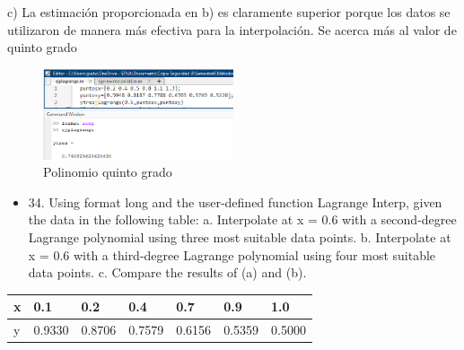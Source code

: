 \documentclass{article}
\begin{document}
c) La estimación proporcionada en b) es claramente superior porque los datos se utilizaron de manera más efectiva para la interpolación. Se acerca más al valor de quinto grado 
\begin{figure}[H]
    \centering
    \includegraphics[width=0.5\textwidth]{33c.png}
    \caption{Polinomio quinto grado}
    \label{fig:imagen1}
    \end{figure}
\begin{itemize}
    \item 34. Using format long and the user-defined function Lagrange
          Interp, given the data in the following table:
          \newline  a. Interpolate at x = 0.6 with a second-degree Lagrange polynomial
          using three most suitable data points.
          \newline  b. Interpolate at x = 0.6 with a third-degree Lagrange polynomial
          using four most suitable data points.
          \newline  c. Compare the results of (a) and (b).
\end{itemize}

\begin{table}[h!]
    \begin{tabular}{l|l|l|l|l|l|l}
        \hline
        \multicolumn{1}{|p{30.865313pt}}{\raggedright x} & \multicolumn{1}{|p{31.618126pt}}{\raggedright 0.1}    & \multicolumn{1}{|p{31.618126pt}}{\raggedright 0.2}    & \multicolumn{1}{|p{33.876564pt}}{\raggedright 0.4}    & \multicolumn{1}{|p{37.640625pt}}{\raggedright 0.7}    & \multicolumn{1}{|p{33.876564pt}}{\raggedright 0.9}    & \multicolumn{1}{|p{33.876564pt}|}{\raggedright 1.0}    \\
        \hline
        \multicolumn{1}{|p{30.865313pt}}{\raggedright y} & \multicolumn{1}{|p{31.618126pt}}{\raggedright 0.9330} & \multicolumn{1}{|p{31.618126pt}}{\raggedright 0.8706} & \multicolumn{1}{|p{33.876564pt}}{\raggedright 0.7579} & \multicolumn{1}{|p{37.640625pt}}{\raggedright 0.6156} & \multicolumn{1}{|p{33.876564pt}}{\raggedright 0.5359} & \multicolumn{1}{|p{33.876564pt}|}{\raggedright 0.5000} \\
        \hline
    \end{tabular}
\end{table}
\end{document}
